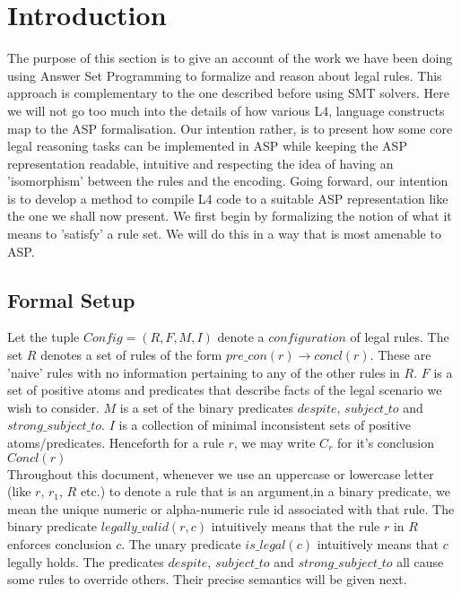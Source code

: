 \section{Introduction}
The purpose of this section is to give an account of the work we have been doing using Answer Set Programming to formalize and reason about legal rules. This approach is complementary to the one described before using SMT solvers. Here we will not go too much into the details of how various L4, language constructs map to the ASP formalisation. Our intention rather, is to present how some core legal reasoning tasks can be implemented in ASP while keeping the ASP representation readable, intuitive and respecting the idea of having an 'isomorphism' between the rules and the encoding. Going forward, our intention is to develop a method to compile L4 code to a suitable ASP representation like the one we shall now present. We first begin by formalizing the notion of what it means to 'satisfy' a rule set. We will do this in a way that is most amenable to ASP.
\subsection{Formal Setup}
Let the tuple $Config = (R,F,M,I)$ denote a $configuration$ of legal rules. The set $R$ denotes a set of rules of the form $pre\_con(r)\rightarrow concl(r)$. These are 'naive' rules with no information pertaining to any of the other rules in $R$. $F$ is a set of positive atoms and predicates that describe facts of the legal scenario we wish to consider. $M$ is a set of the binary predicates $despite$, $subject\_to$ and $strong\_subject\_to$. $I$ is a collection of minimal inconsistent sets of positive atoms/predicates. Henceforth for a rule $r$, we may write $C_{r}$ for it's conclusion $Concl(r)$ \\
\newline
Throughout this document, whenever we use an uppercase or lowercase letter (like $r$, $r_{1}$, $R$ etc.) to denote a rule that is an argument,in a binary predicate, we mean the unique numeric or alpha-numeric rule id associated with that rule. The binary predicate $legally\_valid(r,c)$ intuitively means that the rule $r$ in $R$ enforces conclusion $c$. The unary predicate $is\_legal(c)$ intuitively means that $c$ legally holds. The predicates $despite$, $subject\_to$ and $strong\_subject\_to$ all cause some rules to override others. Their precise semantics will be given next.
